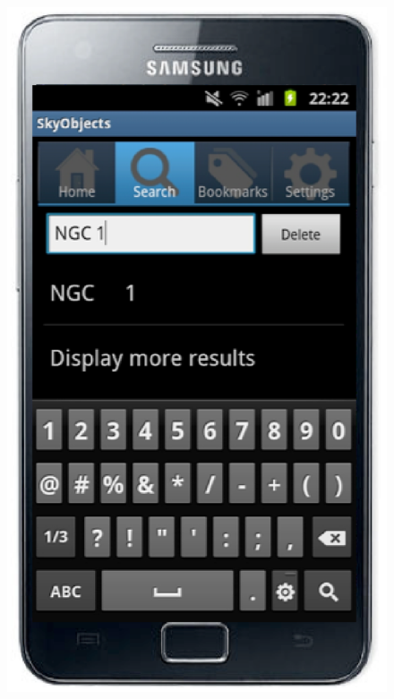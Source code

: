 \documentclass[11pt,twoside]{article}
\begin{document}
\begin{figure}[h] \center
\includegraphics[scale=0.28]{O28_f5.eps}

\end{figure}
\end{document}
